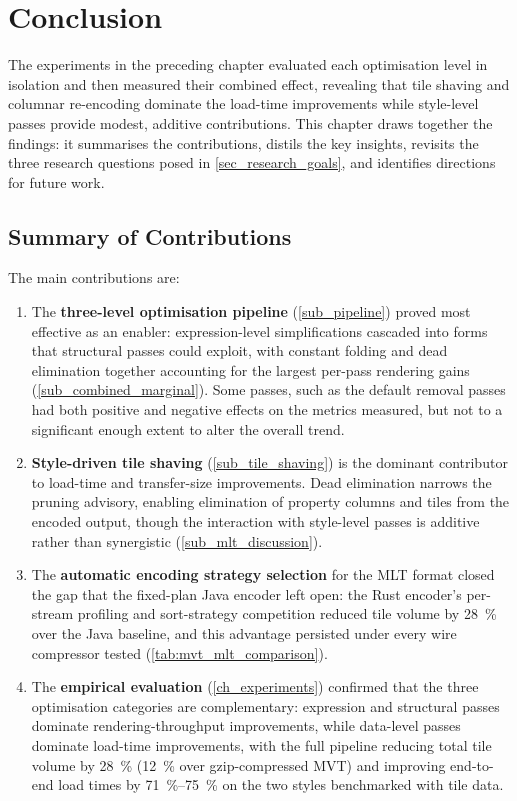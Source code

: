 \chapter{Conclusion}\label{ch_conclusion}

The experiments in the preceding chapter evaluated each optimisation level in isolation and then measured their combined effect, revealing that tile shaving and columnar re-encoding dominate the load-time improvements while style-level passes provide modest, additive contributions.
This chapter draws together the findings: it summarises the contributions, distils the key insights, revisits the three research questions posed in \cref{sec_research_goals}, and identifies directions for future work.

\section{Summary of Contributions}

The main contributions are:

\begin{enumerate}
    \item The \textbf{three-level optimisation pipeline} (\cref{sub_pipeline}) proved most effective as an enabler: expression-level simplifications cascaded into forms that structural passes could exploit, with constant folding and dead elimination together accounting for the largest per-pass rendering gains (\cref{sub_combined_marginal}).
    Some passes, such as the default removal passes had both positive and negative effects on the metrics measured, but not to a significant enough extent to alter the overall trend.

    \item \textbf{Style-driven tile shaving} (\cref{sub_tile_shaving}) is the dominant contributor to load-time and transfer-size improvements.  Dead elimination narrows the pruning advisory, enabling elimination of property columns and tiles from the encoded output, though the interaction with style-level passes is additive rather than synergistic (\cref{sub_mlt_discussion}).

    \item The \textbf{automatic encoding strategy selection} for the \ac{MLT} format closed the gap that the fixed-plan Java encoder left open: the Rust encoder's per-stream profiling and sort-strategy competition reduced tile volume by \qty{28}{\percent} over the Java baseline, and this advantage persisted under every wire compressor tested (\cref{tab:mvt_mlt_comparison}).

    \item The \textbf{empirical evaluation} (\cref{ch_experiments}) confirmed that the three optimisation categories are complementary: expression and structural passes dominate rendering-throughput improvements, while data-level passes dominate load-time improvements, with the full pipeline reducing total tile volume by \qty{28}{\percent} (\qty{12}{\percent} over gzip-compressed \ac{MVT}) and improving end-to-end load times by \qtyrange{71}{75}{\percent} on the two styles benchmarked with tile data.
\end{enumerate}

